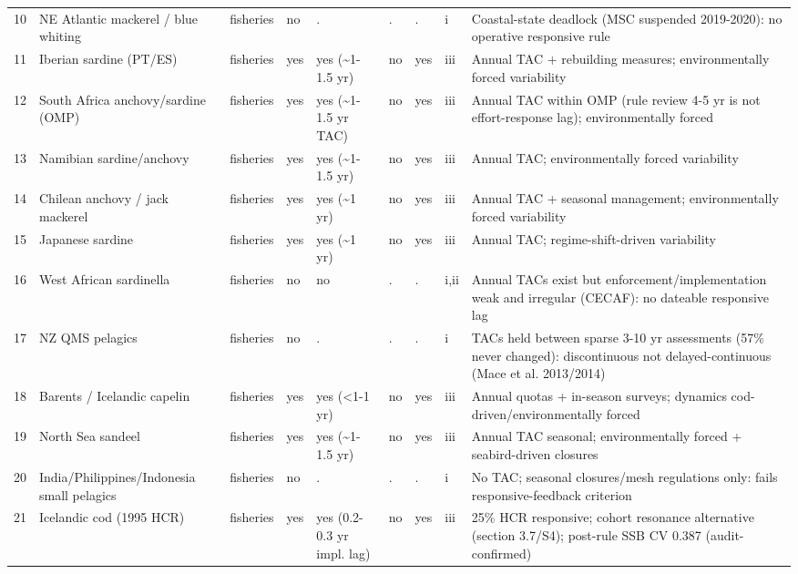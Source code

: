 \begin{landscape}
\begin{longtable}{@{}p{0.55cm}p{3.3cm}p{1.6cm}p{1.0cm}p{1.6cm}p{1.05cm}p{1.0cm}p{1.0cm}p{10.8cm}@{}}
10 & NE Atlantic mackerel \allowbreak/ blue whiting & fisheries & no & .  & .  & .  & i & Coastal-state deadlock (MSC suspended 2019-2020): no operative responsive rule \\
11 & Iberian sardine (PT\allowbreak/ES) & fisheries & yes & yes (\textasciitilde{}1-1.5 yr) & no & yes & iii & Annual TAC + rebuilding measures; environmentally forced variability \\
12 & South Africa anchovy\allowbreak/sardine (OMP) & fisheries & yes & yes (\textasciitilde{}1-1.5 yr TAC) & no & yes & iii & Annual TAC within OMP (rule review 4-5 yr is not effort-response lag); environmentally forced \\
13 & Namibian sardine\allowbreak/anchovy & fisheries & yes & yes (\textasciitilde{}1-1.5 yr) & no & yes & iii & Annual TAC; environmentally forced variability \\
14 & Chilean anchovy \allowbreak/ jack mackerel & fisheries & yes & yes (\textasciitilde{}1 yr) & no & yes & iii & Annual TAC + seasonal management; environmentally forced variability \\
15 & Japanese sardine & fisheries & yes & yes (\textasciitilde{}1 yr) & no & yes & iii & Annual TAC; regime-shift-driven variability \\
16 & West African sardinella & fisheries & no & no & .  & .  & i,ii & Annual TACs exist but enforcement/implementation weak and irregular (CECAF): no dateable responsive lag \\
17 & NZ QMS pelagics & fisheries & no & .  & .  & .  & i & TACs held between sparse 3-10 yr assessments (57\% never changed): discontinuous not delayed-continuous (Mace et al. 2013/2014) \\
18 & Barents \allowbreak/ Icelandic capelin & fisheries & yes & yes (<1-1 yr) & no & yes & iii & Annual quotas + in-season surveys; dynamics cod-driven/environmentally forced \\
19 & North Sea sandeel & fisheries & yes & yes (\textasciitilde{}1-1.5 yr) & no & yes & iii & Annual TAC seasonal; environmentally forced + seabird-driven closures \\
20 & India\allowbreak/Philippines\allowbreak/Indonesia small pelagics & fisheries & no & .  & .  & .  & i & No TAC; seasonal closures/mesh regulations only: fails responsive-feedback criterion \\
21 & Icelandic cod (1995 HCR) & fisheries & yes & yes (0.2-0.3 yr impl. lag) & no & yes & iii & 25\% HCR responsive; cohort resonance alternative (section 3.7/S4); post-rule SSB CV 0.387 (audit-confirmed) \\

\end{longtable}
\end{landscape}

